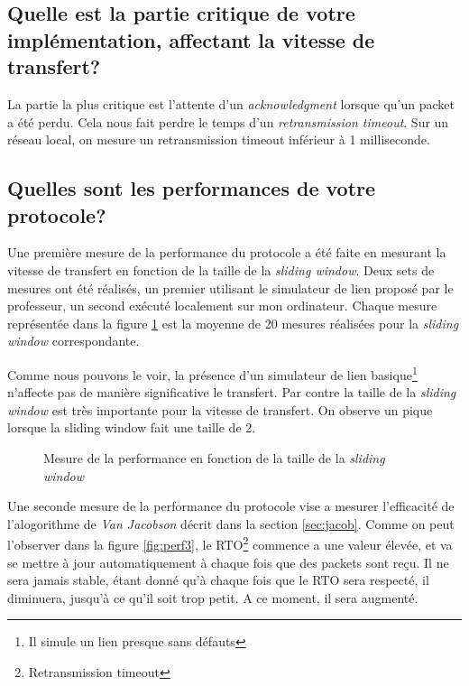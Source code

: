 \documentclass[10pt,a4paper]{article}
\begin{document}
\subsection{Quelle est la partie critique de votre implémentation, affectant la vitesse de transfert?}
La partie la plus critique est l'attente d'un \textit{acknowledgment} lorsque qu'un packet a été perdu. Cela nous fait perdre le temps d'un \textit{retransmission timeout}. Sur un réseau local, on mesure un retransmission timeout inférieur à 1 milliseconde.


\subsection{Quelles sont les performances de votre protocole?}

Une première mesure de la performance du protocole a été faite en mesurant la vitesse de transfert en fonction de la taille de la \textit{sliding window}. Deux sets de mesures ont été réalisés, un premier utilisant le simulateur de lien proposé par le professeur, un second exécuté localement sur mon ordinateur. Chaque mesure représentée dans la figure \ref{fig:perf} est la moyenne de 20 mesures réalisées pour la \textit{sliding window} correspondante.

Comme nous pouvons le voir, la présence d'un simulateur de lien basique\footnote{Il simule un lien presque sans défauts} n'affecte pas de manière significative le transfert. Par contre la taille de la \textit{sliding window} est très importante pour la vitesse de transfert. On observe un pique lorsque la sliding window fait une taille de 2.

\begin{figure}[!h]
\centering
{}
\caption{Mesure de la performance en fonction de la taille de la \textit{sliding window}}
\label{fig:perf}
\end{figure}

Une seconde mesure de la performance du protocole vise a mesurer l'efficacité de l'alogorithme de \textit{Van Jacobson} décrit dans la section \ref{sec:jacob}. Comme on peut l'observer dans la figure \ref{fig:perf3}, le RTO\footnote{Retransmission timeout} commence a une valeur élevée, et va se mettre à jour automatiquement à chaque fois que des packets sont reçu. Il ne sera jamais stable, étant donné qu'à chaque fois que le RTO sera respecté, il diminuera, jusqu'à ce qu'il soit trop petit. A ce moment, il sera augmenté.
\end{document}
